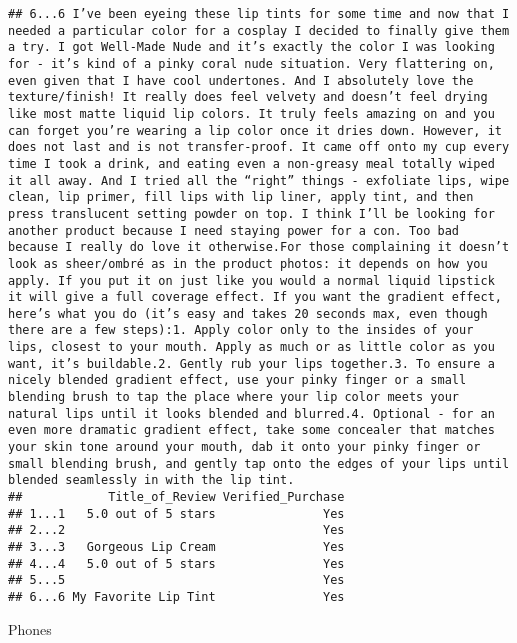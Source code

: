 \documentclass[
  11pt,
]{article}
\begin{document}
\begin{verbatim}
## 6...6 I’ve been eyeing these lip tints for some time and now that I needed a particular color for a cosplay I decided to finally give them a try. I got Well-Made Nude and it’s exactly the color I was looking for - it’s kind of a pinky coral nude situation. Very flattering on, even given that I have cool undertones. And I absolutely love the texture/finish! It really does feel velvety and doesn’t feel drying like most matte liquid lip colors. It truly feels amazing on and you can forget you’re wearing a lip color once it dries down. However, it does not last and is not transfer-proof. It came off onto my cup every time I took a drink, and eating even a non-greasy meal totally wiped it all away. And I tried all the “right” things - exfoliate lips, wipe clean, lip primer, fill lips with lip liner, apply tint, and then press translucent setting powder on top. I think I’ll be looking for another product because I need staying power for a con. Too bad because I really do love it otherwise.For those complaining it doesn’t look as sheer/ombré as in the product photos: it depends on how you apply. If you put it on just like you would a normal liquid lipstick it will give a full coverage effect. If you want the gradient effect, here’s what you do (it’s easy and takes 20 seconds max, even though there are a few steps):1. Apply color only to the insides of your lips, closest to your mouth. Apply as much or as little color as you want, it’s buildable.2. Gently rub your lips together.3. To ensure a nicely blended gradient effect, use your pinky finger or a small blending brush to tap the place where your lip color meets your natural lips until it looks blended and blurred.4. Optional - for an even more dramatic gradient effect, take some concealer that matches your skin tone around your mouth, dab it onto your pinky finger or small blending brush, and gently tap onto the edges of your lips until blended seamlessly in with the lip tint.
##            Title_of_Review Verified_Purchase
## 1...1   5.0 out of 5 stars               Yes
## 2...2                                    Yes
## 3...3   Gorgeous Lip Cream               Yes
## 4...4   5.0 out of 5 stars               Yes
## 5...5                                    Yes
## 6...6 My Favorite Lip Tint               Yes
\end{verbatim}

Phones
\end{document}
